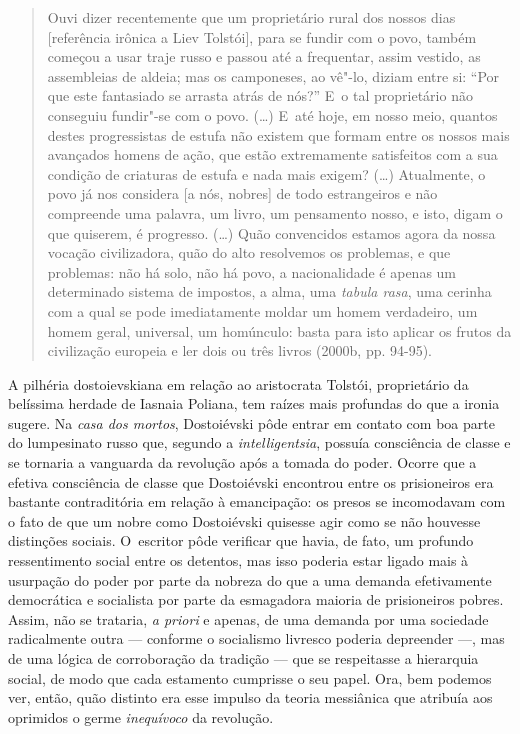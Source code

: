 \begin{quote}
Ouvi dizer recentemente que um proprietário rural dos nossos dias
{[}referência irônica a Liev Tolstói{]}, para se fundir com o povo,
também começou a usar traje russo e passou até a frequentar, assim
vestido, as assembleias de aldeia; mas os camponeses, ao vê"-lo, diziam
entre si: ``Por que este fantasiado se arrasta atrás de nós?'' E~o tal
proprietário não conseguiu fundir"-se com o povo. (\ldots) E~até hoje, em
nosso meio, quantos destes progressistas de estufa não existem que
formam entre os nossos mais avançados homens de ação, que estão
extremamente satisfeitos com a sua condição de criaturas de estufa e
nada mais exigem? (\ldots) Atualmente, o povo já nos considera {[}a nós,
nobres{]} de todo estrangeiros e não compreende uma palavra, um livro,
um pensamento nosso, e isto, digam o que quiserem, é progresso. (\ldots)
Quão convencidos estamos agora da nossa vocação civilizadora, quão do
alto resolvemos os problemas, e que problemas: não há solo, não há povo,
a nacionalidade é apenas um determinado sistema de impostos, a alma, uma
\emph{tabula rasa}, uma cerinha com a qual se pode imediatamente moldar
um homem verdadeiro, um homem geral, universal, um homúnculo: basta para
isto aplicar os frutos da civilização europeia e ler dois ou três livros
(2000b, pp. 94-95).
\end{quote}

A pilhéria dostoievskiana em relação ao aristocrata Tolstói,
proprietário da belíssima herdade de Iasnaia Poliana, tem raízes mais
profundas do que a ironia sugere. Na \emph{casa dos mortos}, Dostoiévski
pôde entrar em contato com boa parte do lumpesinato russo que, segundo a
\emph{intelligentsia}, possuía consciência de classe e se tornaria a
vanguarda da revolução após a tomada do poder. Ocorre que a efetiva
consciência de classe que Dostoiévski encontrou entre os prisioneiros
era bastante contraditória em relação à emancipação: os presos se
incomodavam com o fato de que um nobre como Dostoiévski quisesse agir
como se não houvesse distinções sociais. O~escritor pôde verificar que
havia, de fato, um profundo ressentimento social entre os detentos, mas
isso poderia estar ligado mais à usurpação do poder por parte da nobreza
do que a uma demanda efetivamente democrática e socialista por parte da
esmagadora maioria de prisioneiros pobres. Assim, não se trataria,
\emph{a priori} e apenas, de uma demanda por uma sociedade radicalmente
outra --- conforme o socialismo livresco poderia depreender ---, mas de
uma lógica de corroboração da tradição --- que se respeitasse a
hierarquia social, de modo que cada estamento cumprisse o seu papel.
Ora, bem podemos ver, então, quão distinto era esse impulso da teoria
messiânica que atribuía aos oprimidos o germe \emph{inequívoco} da
revolução.


